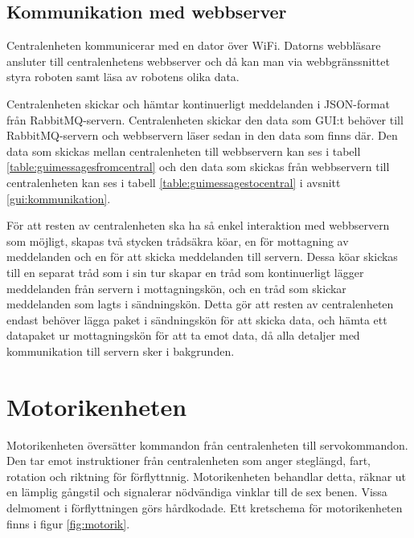 \documentclass[a4paper,titlepage,12pt]{article}
\begin{document}
	\subsection{Kommunikation med webbserver}
	Centralenheten kommunicerar med en dator över WiFi. Datorns webbläsare 
	ansluter till centralenhetens webbserver och då kan man
	via webbgränssnittet styra roboten samt läsa av robotens olika data. 
		
	Centralenheten skickar och hämtar kontinuerligt meddelanden i JSON-format från
    RabbitMQ-servern. Centralenheten skickar den data som GUI:t
	behöver till RabbitMQ-servern och webbservern läser sedan in den data som finns där.
	Den data som skickas mellan centralenheten till webbservern kan ses i
	tabell \ref{table:guimessagesfromcentral} och den data som skickas från
    webbservern till centralenheten kan ses i tabell
    \ref{table:guimessagestocentral} i avsnitt \ref{gui:kommunikation}.

    För att resten av centralenheten ska ha så enkel interaktion med
    webbservern som möjligt, skapas två stycken trådsäkra köar, en för mottagning av
    meddelanden och en för att skicka meddelanden till servern. Dessa köar
    skickas till en separat tråd som i sin tur skapar en tråd som kontinuerligt
    lägger meddelanden från servern i mottagningskön, och en tråd som skickar
    meddelanden som lagts i sändningskön. Detta gör att resten av
    centralenheten endast behöver lägga paket i sändningskön för att skicka
    data, och hämta ett datapaket ur mottagningskön för att ta emot data, då
    alla detaljer med kommunikation till servern sker i bakgrunden.
    

    \newpage
	\section{Motorikenheten}
	Motorikenheten översätter kommandon från centralenheten till servokommandon. Den tar emot 
	instruktioner från centralenheten som anger steglängd, fart, rotation och riktning för 
	förflyttnnig. Motorikenheten behandlar detta, räknar ut en lämplig gångstil och 
	signalerar nödvändiga vinklar till de sex benen. Vissa delmoment i förflyttningen 
	görs hårdkodade. Ett kretschema för motorikenheten finns i figur \ref{fig:motorik}.
\end{document}
